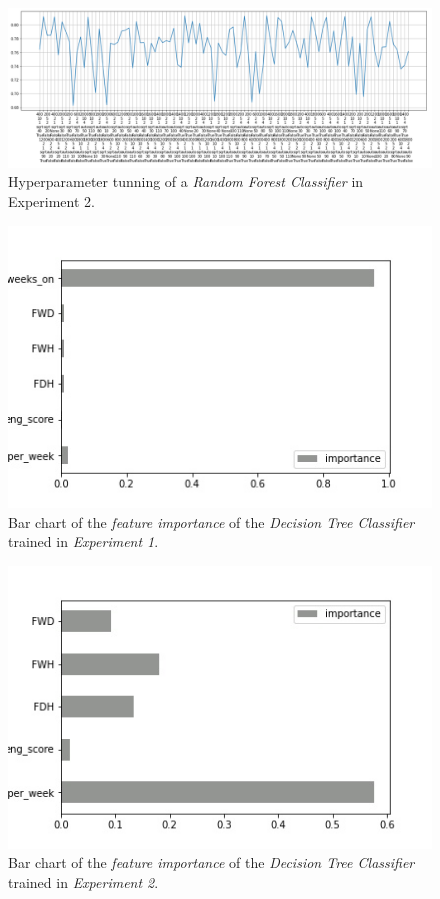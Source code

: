 \documentclass[sigplan,screen]{acmart}
\begin{document}
\begin{figure}[h]
    \centering
    \includegraphics[width=\linewidth]{reports/figures/random_forest_2.png}
    \caption{Hyperparameter tunning of a \emph{Random Forest Classifier} in Experiment 2.}
    \label{fig:hyp_forest_2}
\end{figure}

 \begin{figure}[h]
     \centering
     \includegraphics[width=0.5\linewidth]{reports/figures/feature_importance_dc_1.jpg}
     \caption{Bar chart of the \emph{feature importance} of the \emph{Decision Tree Classifier} trained in \emph{Experiment 1}.}
     \label{fig:fi_dc_1}
 \end{figure}
 
 \begin{figure}[h]
     \centering
     \includegraphics[width=0.5\linewidth]{reports/figures/feature_importance_dc_2.jpg}
     \caption{Bar chart of the \emph{feature importance} of the \emph{Decision Tree Classifier} trained in \emph{Experiment 2}.}
     \label{fig:fi_dc_2}
 \end{figure}
\end{document}
